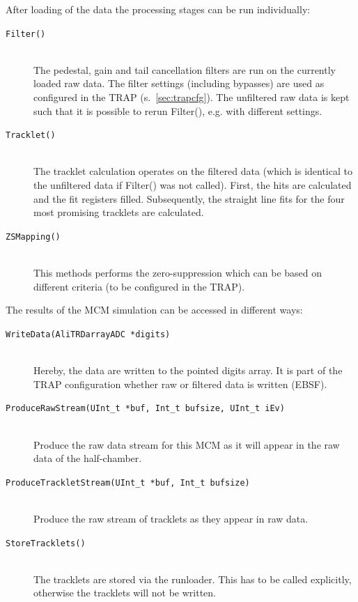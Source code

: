 \documentclass{alicetdr}
\begin{document}
After loading of the data the processing stages can be run
individually:
\begin{description}
\item[{\tt Filter()}] ~\\ The pedestal, gain and tail cancellation filters
  are run on the currently loaded raw data. The filter settings
  (including bypasses) are used as configured in the TRAP
  (s.~\ref{sec:trapcfg}). The unfiltered raw data is kept such that it
  is possible to rerun Filter(), e.g. with different settings.
\item[{\tt Tracklet()}] ~\\ The tracklet calculation operates on the
  filtered data (which is identical to the unfiltered data if Filter()
  was not called). First, the hits are calculated and the fit
  registers filled. Subsequently, the straight line fits for the four
  most promising tracklets are calculated.
\item[{\tt ZSMapping()}] ~\\ This methods performs the zero-suppression
  which can be based on different criteria (to be configured in the
  TRAP).
\end{description}

The results of the MCM simulation can be accessed in different ways:
\begin{description}
\item[{\tt WriteData(AliTRDarrayADC *digits)}] ~\\ Hereby, the data are
  written to the pointed digits array. It is part of the TRAP
  configuration whether raw or filtered data is written (EBSF).
\item[{\tt ProduceRawStream(UInt\_t *buf, Int\_t bufsize, UInt\_t
    iEv)}] ~\\ Produce the raw data stream for this MCM as it will
  appear in the raw data of the half-chamber.
\item[{\tt ProduceTrackletStream(UInt\_t *buf, Int\_t bufsize)}] ~\\
  Produce the raw stream of tracklets as they appear in raw data.
\item[{\tt StoreTracklets()}] ~\\ The tracklets are stored via the
  runloader. This has to be called explicitly, otherwise the tracklets
  will not be written.
\end{description}
\end{document}
